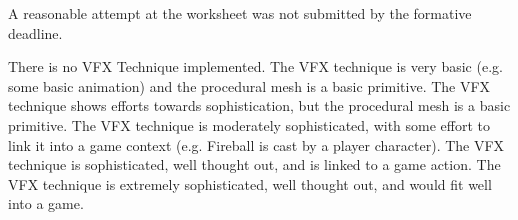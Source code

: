 \documentclass{../../../fal_assignment}
\begin{document}
\begin{markingrubric}

		\grade\fail	A reasonable attempt at the worksheet was not submitted by the formative deadline.
		\vspace{\baselineskip}
		
	\grade\fail There is no VFX Technique implemented.
		\grade The VFX technique is very basic (e.g. some basic animation) and the procedural mesh is a basic primitive.
		\grade The VFX technique shows efforts towards sophistication, but the procedural mesh is a basic primitive.
		\grade The VFX technique is moderately sophisticated, with some effort to link it into a game context (e.g. Fireball is cast by a player character).
		\vspace{\baselineskip}
		\grade The VFX technique is sophisticated, well thought out, and is linked to a game action.
		\grade The VFX technique is extremely sophisticated, well thought out, and would fit well into a game.


\end{markingrubric}
\end{document}
